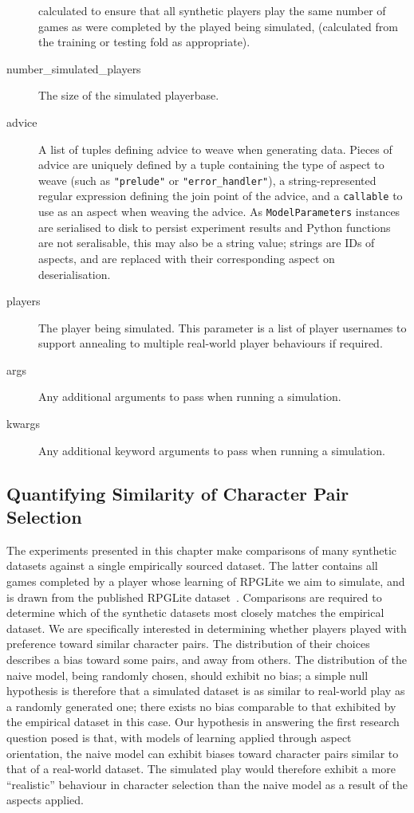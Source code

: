 \begin{description}
  calculated to ensure that all synthetic players play the same number of games
  as were completed by the played being simulated, (calculated from the training
  or testing fold as appropriate).
  \item[number\_simulated\_players] The size of the simulated playerbase.
  \item[advice] A list of tuples defining advice to weave when generating data.
  Pieces of advice are uniquely defined by a tuple containing the type of aspect
  to weave (such as \lstinline{"prelude"} or \lstinline{"error_handler"}), a
  string-represented regular expression defining the join point of the advice,
  and a \lstinline{callable} to use as an aspect when weaving the advice. As
  \lstinline{ModelParameters} instances are serialised to disk to persist
  experiment results and Python functions are not seralisable, this may also be
  a string value; strings are IDs of aspects, and are replaced with their
  corresponding aspect on deserialisation.
  \item[players] The player being simulated. This parameter is a list of player
  usernames to support annealing to multiple real-world player behaviours if required.
  \item[args] Any additional arguments to pass when running a simulation.
  \item[kwargs] Any additional keyword arguments to pass when running a simulation.
\end{description}



\subsection{Quantifying Similarity of Character Pair Selection}

The experiments presented in this chapter make comparisons of many synthetic
datasets against a single empirically sourced dataset. The latter contains all games
completed by a player whose learning of RPGLite we aim to simulate, and is drawn
from the published RPGLite dataset~\cite{rpglite_dataset}. Comparisons are
required to determine which of the synthetic datasets most closely matches the
empirical dataset. We are specifically interested in determining whether players
played with preference toward similar character pairs. The distribution of their
choices describes a bias toward some pairs, and away from others. The
distribution of the naive model, being randomly chosen, should exhibit no bias;
a simple null hypothesis is therefore that a simulated dataset is as similar to
real-world play as a randomly generated one; there exists no bias comparable to
that exhibited by the empirical dataset in this case. Our hypothesis in
answering the first research question posed is that, with models of learning
applied through aspect orientation, the naive model can exhibit biases toward
character pairs similar to that of a real-world dataset. The simulated play
would therefore exhibit a more ``realistic'' behaviour in character selection
than the naive model as a result of the aspects applied.

